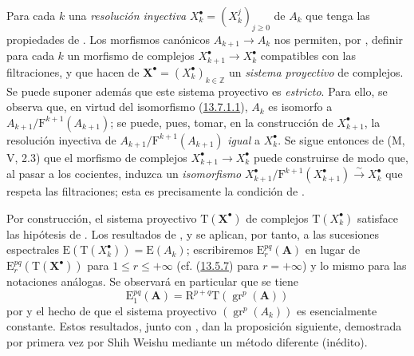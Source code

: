 \begin{env}[13.7.2]
\label{0.13.7.2}
\label{0.13.7.2-fr}
Para cada $k$ una \emph{resolución inyectiva} $X_k^\bullet=(X_k^j)_{j\geq0}$ de $A_k$ que tenga las
propiedades de .
Los morfismos canónicos $A_{k+1}\to A_k$ nos permiten, por
, definir para cada $k$ un morfismo de complejos
$X_{k+1}^\bullet\to X_k^\bullet$ compatibles
con las filtraciones, y que hacen de
$\mathbf X^\bullet=(X_k^\bullet)_{k\in\mathbb Z}$ un \emph{sistema proyectivo} de complejos. Se puede suponer además que este sistema proyectivo es \emph{estricto}. Para ello, se observa que, en virtud del isomorfismo (\hyperref[0.13.7.1.1-fr]{13.7.1.1}), $A_k$ es isomorfo a $A_{k+1}/\mathrm F^{k+1}(A_{k+1})$; se puede, pues, tomar, en la construcción de $X_{k+1}^\bullet$, la resolución inyectiva de $A_{k+1}/\mathrm F^{k+1}(A_{k+1})$ \emph{igual} a
$X_k^\bullet$.
Se sigue entonces de (M, V, 2.3) que el morfismo de complejos
$X_{k+1}^\bullet\to X_k^\bullet$ puede
construirse de modo que, al pasar a los cocientes, induzca un
\emph{isomorfismo}
$X_{k+1}^\bullet/\mathrm F^{k+1}(X_{k+1}^\bullet)
\xrightarrow{\sim}X_k^\bullet$
que respeta las filtraciones; esta es precisamente la condición de
.
\end{env}

\begin{env}[13.7.3]
\label{0.13.7.3}
\label{0.13.7.3-fr}
Por construcción, el sistema proyectivo
$\mathrm T(\mathbf X^\bullet)$ de complejos
$\mathrm T(X_k^\bullet)$ satisface las hipótesis de
.
Los resultados de ,  y
 se aplican, por tanto, a las sucesiones espectrales
$\mathrm E(\mathrm T(X_k^\bullet))=\mathrm E(A_k)$; escribiremos $\mathrm E_r^{pq}(\mathbf A)$ en lugar de
$\mathrm E_r^{pq}(\mathrm T(\mathbf X^\bullet))$ para $1\leq r\leq+\infty$ (cf. (\hyperref[0.13.5.7-fr]{13.5.7}) para $r=+\infty$) y lo mismo para las notaciones análogas. Se observará en particular que se tiene \begin{equation}
\label{0.13.7.3.1-fr}
\tag{13.7.3.1}
\mathrm E_1^{pq}(\mathbf A)=
\mathrm R^{p+q}\mathrm T(\operatorname{gr}^p(\mathbf A))
\end{equation}
por  y el hecho de que el sistema proyectivo
$(\operatorname{gr}^p(A_k))$ es esencialmente constante.
Estos resultados, junto con , dan la proposición
siguiente, demostrada por primera vez por Shih Weishu mediante un método
diferente (inédito).
\end{env}

